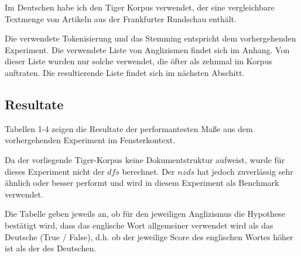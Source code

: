 \documentclass[11pt,numbers=noenddot]{scrartcl}
\begin{document}
Im Deutschen habe ich den Tiger Korpus \citep{Brants2004} verwendet, der eine vergleichbare Textmenge von Artikeln aus der Frankfurter Rundschau enthält.

Die verwendete Tokenisierung und das Stemming entspricht dem vorhergehenden Experiment. Die verwendete Liste von Anglizismen findet sich im Anhang. Von dieser Liste wurden nur solche verwendet, die öfter als zehnmal im Korpus auftraten. Die resultierende Liste findet sich im nächsten Abschitt.

\subsection{Resultate}

Tabellen 1-4 zeigen die Resultate der performantesten Maße aus dem vorhergehenden Experiment im Fensterkontext.

Da der vorliegende Tiger-Korpus keine Dokumentstruktur aufweist, wurde für dieses Experiment nicht der $dfs$ berechnet. Der $nzds$ hat jedoch zuverlässig sehr ähnlich oder besser performt und wird in diesem Experiment als Benchmark verwendet.

Die Tabelle geben jeweils an, ob für den jeweiligen Anglizismus die Hypothese bestätigt wird, dass das englische Wort allgemeiner verwendet wird als das Deutsche (True / False), d.h. ob der jeweilige Score des englischen Wortes höher ist als der des Deutschen.
\end{document}
